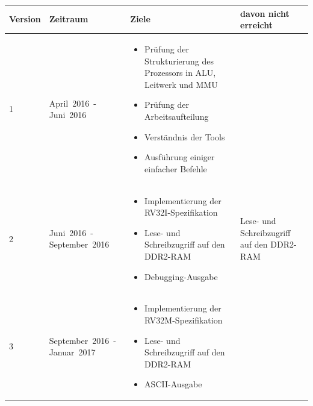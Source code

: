 \begin{table}
\begin{tabular}{|p{50pt}|p{80pt}|p{220pt}|p{110pt}|}
\hline
Version & Zeitraum                                   & Ziele                                                                            & davon nicht erreicht                          \\
\hline
1       & \mbox{April 2016 -} \mbox{Juni 2016}       & \begin{itemize}[noitemsep,topsep=0pt]
                                                       \item Pr\"ufung der Strukturierung des Prozessors in ALU, Leitwerk und MMU
                                                       \item Pr\"ufung der Arbeitsaufteilung
                                                       \item Verst\"andnis der Tools
                                                       \item Ausf\"uhrung einiger einfacher Befehle
                                                       \end{itemize}                                                                    &                                               \\
\hline
2       & \mbox{Juni 2016 -} \mbox{September 2016}   & \begin{itemize}[noitemsep,topsep=0pt]
                                                       \item Implementierung der RV32I-Spezifikation
                                                       \item Lese- und Schreibzugriff auf den DDR2-RAM
                                                       \item Debugging-Ausgabe
                                                       \end{itemize}                                                                    & Lese- und Schreibzugriff auf den DDR2-RAM     \\
\hline
3       & \mbox{September 2016 -} \mbox{Januar 2017} & \begin{itemize}[noitemsep,topsep=0pt]
                                                       \item Implementierung der RV32M-Spezifikation
                                                       \item Lese- und Schreibzugriff auf den DDR2-RAM
                                                       \item ASCII-Ausgabe

\end{itemize}
\end{tabular}
\end{table}
